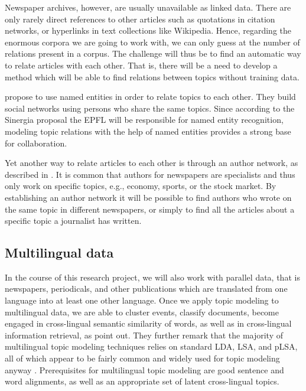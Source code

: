 Newspaper archives, however, are usually unavailable as linked data. There are only rarely direct references to other articles such as quotations in citation networks, or hyperlinks in text collections like Wikipedia. Hence,  regarding the enormous corpora we are going to work with, we can only guess at the number of relations present in a corpus. The challenge will thus be to find an automatic way to relate articles with each other. That is, there will be a need to develop a method which will be able to find relations between topics without training data.

\citet{newmanprobabilistic2006} propose to use named entities in order to relate topics to each other. They build social networks using persons who share the same topics. Since according to the Sinergia proposal the EPFL will be responsible for named entity recognition, modeling topic relations with the help of named entities provides a strong base for collaboration. 

Yet another way to relate articles to each other is through an author network, as described in \citet{rosenauthor2004}. It is common that authors for newspapers are specialists and thus only work on specific topics, e.g., economy, sports, or the stock market. By establishing an author network it will be possible to find authors who wrote on the same topic in different newspapers, or simply to find all the articles about a specific topic a journalist has written. 

\subsection{Multilingual data}
In the course of this research project, we will also work with parallel data, that is newspapers, periodicals, and other publications which are translated from one language into at least one other language. Once we apply topic modeling to multilingual data, we are able to cluster events, classify documents, become engaged in cross-lingual semantic similarity of words, as well as in cross-lingual information retrieval, as \citet{vulicprobabilistic2015} point out. They further remark that the majority of multilingual topic modeling techniques relies on standard LDA, LSA, and pLSA, all of which appear to be fairly common and widely used for topic modeling anyway \citep{dumaisautomatic1997,mimnopolylingual2009,zhangcrosslingual2010,nicross2011}. Prerequisites for multilingual topic modeling are good sentence and word alignments, as well as an appropriate set of latent cross-lingual topics.

